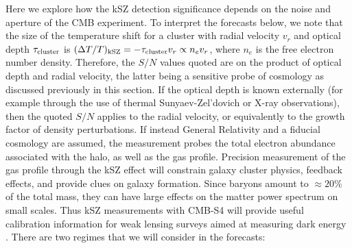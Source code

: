 Here we explore how the kSZ detection significance depends on the noise and aperture of the CMB experiment. 
To interpret the forecasts below, we note that the size of the temperature shift for a cluster with radial velocity $v_r$ and optical depth $\tau_{\rm cluster}$ is $(\Delta T/T)_{\rm kSZ} = - \tau_{\rm cluster} v_r \propto n_e v_r$, where $n_e$ is the free electron number density.  Therefore, the $S/N$ values quoted are on the product of optical depth and radial velocity, the latter being a sensitive probe of cosmology as discussed previously in this section.  If the optical depth is known externally (for example through the use of thermal Sunyaev-Zel'dovich or X-ray observations), then the quoted $S/N$ applies to the radial velocity, or equivalently to the growth factor of density perturbations.  If instead General Relativity and a fiducial cosmology are assumed,
the measurement probes the total electron abundance associated with the halo, as well as the gas profile. Precision measurement of the gas profile through the kSZ effect will constrain galaxy cluster physics, feedback effects, and provide clues on galaxy formation. 
Since baryons amount to $\approx 20$\% of the total mass, they can have large effects on the matter power spectrum on small scales. Thus kSZ measurements with CMB-S4 will provide useful calibration information for weak lensing surveys aimed at measuring dark energy \cite{vanDaalen:2011xb, Mohammed:2014mba}.
There are two regimes that we will consider in the forecasts:

